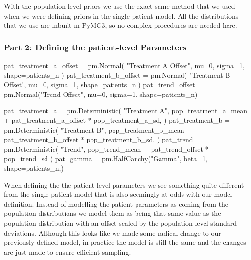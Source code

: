 \documentclass[12pt,a4paper,leqno]{report}
\theoremstyle{plain}
\theoremstyle{definition}
\theoremstyle{remark}
\begin{document}
With the population-level priors we use the exact same method that we used when we were
defining priors in the single patient model. All the distributions that we use are
inbuilt in PyMC3, so no complex procedures are needed here.


\subsubsection*{Part 2: Defining the patient-level Parameters}

\bigskip
\begin{pyverbatim}[][fontsize=\footnotesize]
    pat_treatment_a_offset = pm.Normal(
        "Treatment A Offset", mu=0, sigma=1, shape=patients_n
    )
    pat_treatment_b_offset = pm.Normal(
        "Treatment B Offset", mu=0, sigma=1, shape=patients_n
    )
    pat_trend_offset = pm.Normal("Trend Offset", mu=0, sigma=1, shape=patients_n)

    pat_treatment_a = pm.Deterministic(
        "Treatment A",
        pop_treatment_a_mean + pat_treatment_a_offset * pop_treatment_a_sd,
    )
    pat_treatment_b = pm.Deterministic(
        "Treatment B",
        pop_treatment_b_mean + pat_treatment_b_offset * pop_treatment_b_sd,
    )
    pat_trend = pm.Deterministic(
        "Trend", pop_trend_mean + pat_trend_offset * pop_trend_sd
    )
    pat_gamma = pm.HalfCauchy("Gamma", beta=1, shape=patients_n,)
\end{pyverbatim}
\smallskip

When defining the the patient level parameters we see something quite different from the
single patient model that is also seemingly at odds with our model definition. Instead
of modelling the patient parameters as coming from the population distributions we model
them as being that same value as the population distribution with an offset scaled by
the population level standard deviations. Although this looks like we made some radical
change to our previously defined model, in practice the model is still the same and
the changes are just made to ensure efficient sampling.
\end{document}
